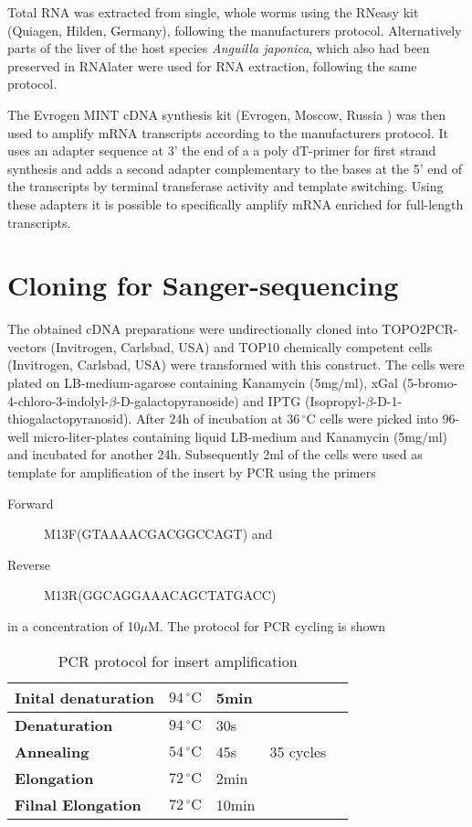 Total RNA was extracted from single, whole worms using the RNeasy kit
(Quiagen, Hilden, Germany), following the manufacturers
protocol. Alternatively parts of the liver of the host species
\textit{Anguilla japonica}, which also had been preserved in RNAlater
were used for RNA extraction, following the same protocol.

The Evrogen MINT cDNA synthesis kit (Evrogen, Moscow, Russia ) was
then used to amplify mRNA transcripts according to the manufacturers
protocol. It uses an adapter sequence at 3' the end of a a poly
dT-primer for first strand synthesis and adds a second adapter
complementary to the bases at the 5' end of the transcripts by
terminal transferase activity and template switching. Using these
adapters it is possible to specifically amplify mRNA enriched for
full-length transcripts.

\section{Cloning for Sanger-sequencing}

The obtained cDNA preparations were undirectionally cloned into
TOPO2PCR-vectors (Invitrogen, Carlsbad, USA) and TOP10 chemically
competent cells (Invitrogen, Carlsbad, USA) were transformed with this
construct. The cells were plated on LB-medium-agarose containing
Kanamycin (5mg/ml), xGal
(5-bromo-4-chloro-3-indolyl-$\beta$-D-galactopyranoside) and IPTG
(Isopropyl-$\beta$-D-1-thiogalactopyranosid). After 24h of incubation
at $36\,^{\circ}\mathrm{C} $ cells were picked into 96-well
micro-liter-plates containing liquid LB-medium and Kanamycin (5mg/ml)
and incubated for another 24h. Subsequently 2ml of the cells were used
as template for amplification of the insert by PCR using the primers
\begin{description}
\item[Forward] M13F(GTAAAACGACGGCCAGT) and
\item[Reverse] M13R(GGCAGGAAACAGCTATGACC)
\end{description}
in a concentration of 10$\mu$M. The protocol for PCR cycling is shown

\begin{table}[h]
  \centering
  \begin{tabular}{lllll} 
    \textbf{Inital denaturation} &  $ 94\, ^{\circ}\mathrm{C} $ & 5min &  &\\ 
    \hline
    \textbf{Denaturation} &  $ 94\, ^{\circ}\mathrm{C} $ &30s& & \\ 
    \textbf{Annealing} &   $ 54\, ^{\circ}\mathrm{C} $ & 45s & 35 cycles &\\ 
    \textbf{Elongation} &   $ 72\, ^{\circ}\mathrm{C} $ & 2min &  &\\ 
    \hline
    \textbf{Filnal Elongation} &   $ 72\, ^{\circ}\mathrm{C} $ & 10min &\\ 
  \end{tabular}   
  \caption{PCR protocol for insert amplification}
  \label{tab:PCR}
\end{table}

